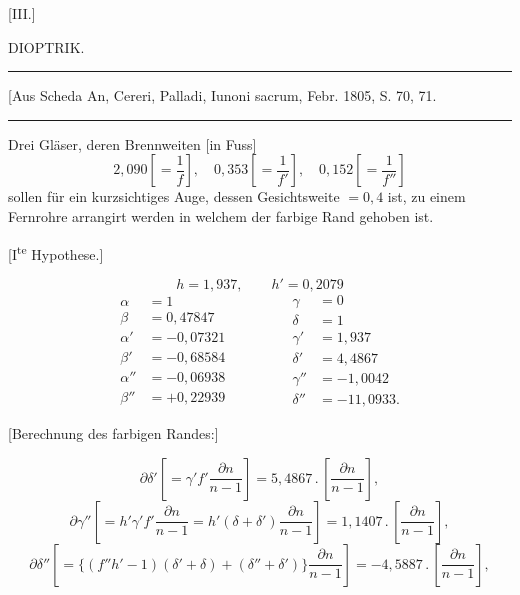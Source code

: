 \clearpage\begingroup
{}\NoSourceHead
\begin{center}
[III.]\par\medskip
\Large DIOPTRIK.\par\medskip
\rule{.25\linewidth}{.4pt}\par\medskip
{\normalsize [Aus Scheda An, Cereri, Palladi, Iunoni sacrum, Febr. 1805, S. 70, 71.}\par\medskip
\rule{.25\linewidth}{.4pt}
\end{center}
\noindent\hspace*{\parindent}Drei Gläser, deren Brennweiten [in Fuss]
\[
2{,}090\left[=\frac1f\right],\quad 0{,}353\left[=\frac1{f'}\right],\quad 0{,}152\left[=\frac1{f''}\right]
\]
\noindent [sind,] sollen für ein kurzsichtiges Auge, dessen Gesichtsweite $=0{,}4$ ist, zu einem Fernrohre arrangirt werden in welchem der farbige Rand gehoben ist.
\begin{center}[I\textsuperscript{te} Hypothese.]\end{center}
\[
h=1{,}937,\qquad h'=0{,}2079
\]
\[
\begin{aligned}
\alpha&=1\\
\beta&=0{,}47847\\
\alpha'&=-0{,}07321\\
\beta'&=-0{,}68584\\
\alpha''&=-0{,}06938\\
\beta''&=+0{,}22939
\end{aligned}\qquad\qquad
\begin{aligned}
\gamma&=0\\
\delta&=1\\
\gamma'&=1{,}937\\
\delta'&=4{,}4867\\
\gamma''&=-1{,}0042\\
\delta''&=-11{,}0933.
\end{aligned}
\]
\begin{center}[Berechnung des farbigen Randes:]\end{center}
\[
\partial\delta'\left[=\gamma'f'\frac{\partial n}{n-1}\right]
=5{,}4867\mathbin{.}\left[\frac{\partial n}{n-1}\right],
\]
\[
\partial\gamma''\left[=h'\gamma'f'\frac{\partial n}{n-1}
=h'(\delta+\delta')\frac{\partial n}{n-1}\right]
=1{,}1407\mathbin{.}\left[\frac{\partial n}{n-1}\right],
\]
\[
\partial\delta''\left[=\{(f''h'-1)(\delta'+\delta)+(\delta''+\delta')\}\frac{\partial n}{n-1}\right]
=-4{,}5887\mathbin{.}\left[\frac{\partial n}{n-1}\right],
\]
\clearpage{}
